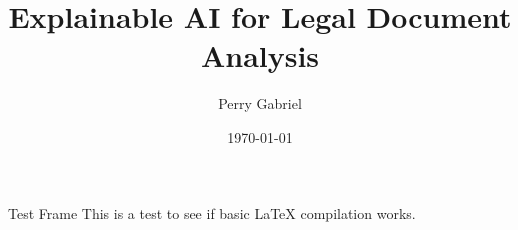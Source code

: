 \documentclass[aspectratio=169]{beamer}
\title[Legal NLP Explainability]{Explainable AI for Legal Document Analysis}
\author[Gabriel]{Perry Gabriel}
\institute[UC Berkeley]{School of Information, UC Berkeley}
\date{\today}
\begin{document}
\frame{\titlepage}

\begin{frame}{Test Frame}
This is a test to see if basic LaTeX compilation works.
\end{frame}
\end{document}
